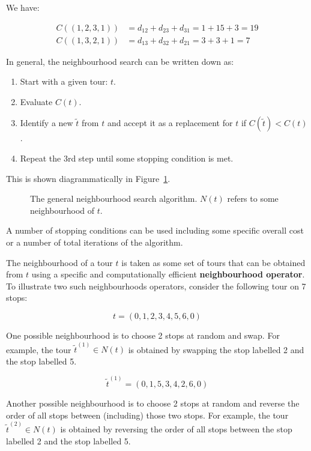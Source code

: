 We have:

\begin{eqnarray*}
    C((1, 2, 3, 1)) &= d_{12} + d_{23} + d_{31} = 1 + 15 + 3 = 19\\
    C((1, 3, 2, 1)) &= d_{13} + d_{32} + d_{21} = 3 + 3 + 1 = 7
\end{eqnarray*}

In general, the neighbourhood search can be written down as:

\begin{enumerate}
    \item Start with a given tour: \(t\).
    \item Evaluate \(C(t)\).
    \item Identify a new \(\tilde t\) from \(t\) and accept it as a replacement
        for \(t\) if \(C(\tilde t)< C(t)\).
    \item Repeat the 3rd step until some stopping condition is met.
\end{enumerate}

This is shown diagrammatically in
Figure~\ref{fig:neighbourhood_search_flow_diagram}.

\begin{figure}[!hbtp]
    \begin{center}
        
    \end{center}
    \caption{The general neighbourhood search algorithm. \(N(t)\) refers to some
    neighbourhood of \(t\).}
    \label{fig:neighbourhood_search_flow_diagram}
\end{figure}

A number of stopping conditions can be used including some specific
overall cost or a number of total iterations of the algorithm.

The neighbourhood of a tour \(t\) is taken as some set of tours that can be
obtained from \(t\) using a specific and computationally efficient
\textbf{neighbourhood operator}.
To illustrate two such neighbourhoods operators, consider the following tour on
7 stops:

\[
    t = (0, 1, 2, 3, 4, 5, 6, 0)
\]

One possible neighbourhood is to choose 2 stops at random and swap. For
example, the tour \(\tilde t^{(1)}\in N(t)\) is obtained by swapping the stop
labelled 2 and the stop labelled 5.

\[
    \tilde t^{(1)} = (0, 1, 5, 3, 4, 2, 6, 0)
\]

Another possible neighbourhood is to choose 2 stops at random and reverse the
order of all stops between (including) those two stops. For example, the tour
\(\tilde t^{(2)} \in N(t)\) is obtained by reversing the order of all stops between
the stop labelled 2 and the stop labelled 5.

